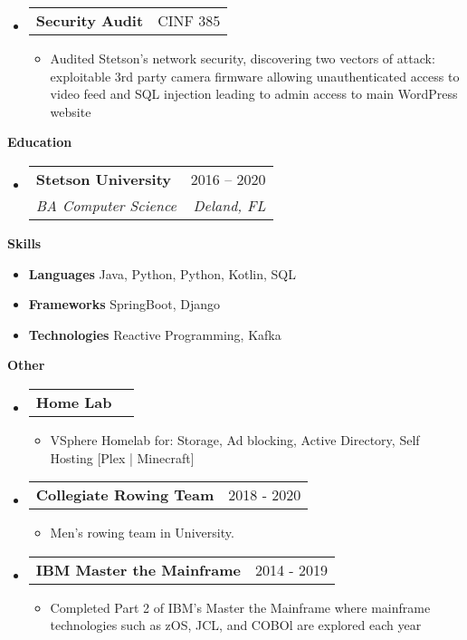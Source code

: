 \documentclass[letterpaper,12pt]{article}[leftmargin=*]
\makeatletter
\def \entryspacing {-0pt}
\renewcommand{\section}[2]{\vspace{5pt}
  \colorbox{secondary}{\color{white}\raggedbottom\normalsize\textbf{{#1}{\hspace{7pt}#2}}}
}
\newcommand{\resumeEntryStart}{\begin{itemize}[leftmargin=2.5mm]}
\newcommand{\resumeEntryEnd}{\end{itemize}\vspace{\entryspacing}}
\newcommand{\resumeItemListStart}{\begin{itemize}[leftmargin=4.5mm]}
\newcommand{\resumeItemListEnd}{\end{itemize}}
\newcommand{\resumeItem}[1]{
  \item\small{
    {#1 \vspace{-2pt}}
  }
}
\newcommand{\resumeEntryTSDL}[4]{
  \vspace{-1pt}\item[]
    \begin{tabularx}{0.97\textwidth}{X@{\hspace{60pt}}r}
      \textbf{\color{primary}#1} & {\firabook\color{accent}\small#2} \\
      \textit{\color{accent}\small#3} & \textit{\color{accent}\small#4} \\
    \end{tabularx}\vspace{-6pt}
}
\newcommand{\resumeEntryTD}[2]{
  \vspace{-1pt}\item[]
    \begin{tabularx}{0.97\textwidth}{X@{\hspace{60pt}}r}
      \textbf{\color{primary}#1} & {\firabook\color{accent}\small#2} \\
    \end{tabularx}\vspace{-6pt}
}
\newcommand{\resumeEntryS}[2]{
  \item[]\small{
    \textbf{\color{primary}#1 }{ #2 \vspace{-6pt}}
  }
}
\makeatother
\begin{document}
  \resumeEntryStart
    \resumeEntryTD
      {Security Audit}{CINF 385}
    \resumeItemListStart
    \resumeItem{Audited Stetson's network security, discovering two vectors of attack: exploitable 3rd party camera firmware allowing unauthenticated access to video feed and SQL injection leading to admin access to main WordPress website}
    \resumeItemListEnd
  \resumeEntryEnd


\section{\faGraduationCap}{Education}

  \resumeEntryStart
    \resumeEntryTSDL
      {Stetson University}{2016 -- 2020}
      {BA Computer Science}{Deland, FL}
  \resumeEntryEnd

\section{\faGears}{Skills}
 \resumeEntryStart
  \resumeEntryS{Languages} {Java, Python, Python, Kotlin, SQL}
  \resumeEntryS{Frameworks} {SpringBoot, Django}
  \resumeEntryS{Technologies}{Reactive Programming, Kafka}
 \resumeEntryEnd
 
 \section{\faGears}{Other}
 \resumeEntryStart
    \resumeEntryTD
      {Home Lab}{}
    \resumeItemListStart
    \resumeItem {VSphere Homelab for: Storage, Ad blocking, Active Directory,
    Self Hosting [Plex | Minecraft]}
    \resumeItemListEnd
  \resumeEntryEnd
 \resumeEntryStart
    \resumeEntryTD
      {Collegiate Rowing Team}{2018 - 2020}
    \resumeItemListStart
      \resumeItem {Men's rowing team in University.}
    \resumeItemListEnd
  \resumeEntryEnd
   \resumeEntryStart
    \resumeEntryTD
      {IBM Master the Mainframe}{2014 - 2019}
    \resumeItemListStart
    \resumeItem {Completed Part 2 of IBM's Master the Mainframe where mainframe
    technologies such as zOS, JCL, and COBOl are explored each year}
    \resumeItemListEnd
  \resumeEntryEnd
\end{document}
